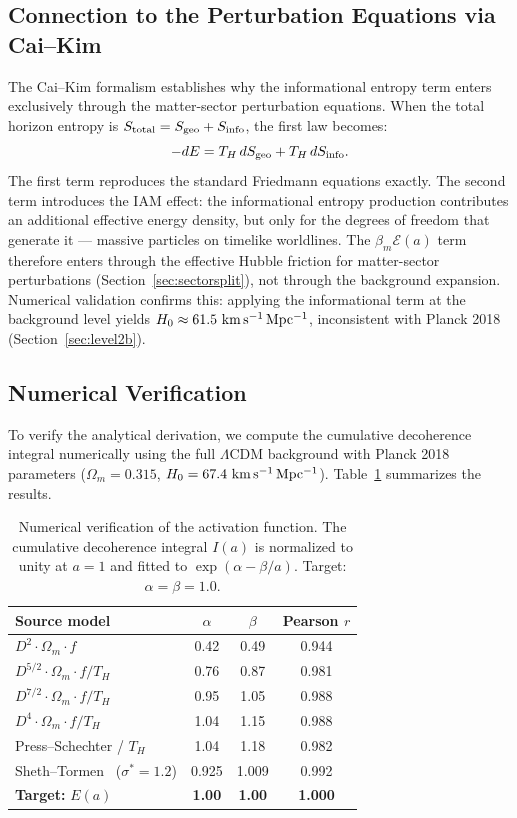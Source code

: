 \documentclass[twocolumn,a4paper,aps,prd,twocolumn,showpacs,notitlepage,superscriptaddress,nofootinbib]{article}
\newcommand{\LCDM}{$\Lambda$CDM}
\newcommand{\betam}{\beta_{m}}
\begin{document}
\subsection{Connection to the Perturbation Equations via Cai--Kim}

The Cai--Kim formalism establishes why the informational entropy term
enters exclusively through the matter-sector perturbation equations.  When
the total horizon entropy is $S_{\rm total} = S_{\rm geo} + S_{\rm info}$,
the first law becomes:
\begin{equation}
-dE = T_H\,dS_{\rm geo} + T_H\,dS_{\rm info}.
\end{equation}
The first term reproduces the standard Friedmann equations exactly.  The
second term introduces the IAM effect: the informational entropy production
contributes an additional effective energy density, but only for the
degrees of freedom that generate it --- massive particles on timelike
worldlines.  The $\betam\mathcal{E}(a)$ term therefore enters through the
effective Hubble friction for matter-sector perturbations
(Section~\ref{sec:sectorsplit}), not through the background expansion.
Numerical validation confirms this: applying the informational term at
the background level yields $H_0 \approx 61.5~\rm km\,s^{-1}\,Mpc^{-1}$,
inconsistent with Planck 2018 (Section~\ref{sec:level2b}).

\subsection{Numerical Verification}

To verify the analytical derivation, we compute the cumulative decoherence
integral numerically using the full \LCDM{} background with Planck 2018
parameters ($\Omega_m = 0.315$, $H_0 = 67.4~\rm km\,s^{-1}\,Mpc^{-1}$).
Table~\ref{tab:numerical} summarizes the results.

\begin{table}[t]
  \centering
  \caption{Numerical verification of the activation function.  The cumulative
    decoherence integral $I(a)$ is normalized to unity at $a=1$ and fitted to
    $\exp(\alpha - \beta/a)$.  Target: $\alpha = \beta = 1.0$.}
  \label{tab:numerical}
  \begin{tabular}{lccc}
    \toprule
    Source model & $\alpha$ & $\beta$ & Pearson $r$ \\
    \midrule
    $D^2 \cdot \Omega_m \cdot f$ & 0.42 & 0.49 & 0.944 \\
    $D^{5/2} \cdot \Omega_m \cdot f / T_H$ & 0.76 & 0.87 & 0.981 \\
    $D^{7/2} \cdot \Omega_m \cdot f / T_H$ & 0.95 & 1.05 & 0.988 \\
    $D^4 \cdot \Omega_m \cdot f / T_H$ & 1.04 & 1.15 & 0.988 \\
    Press--Schechter / $T_H$ & 1.04 & 1.18 & 0.982 \\
    Sheth--Tormen~\citep{ShethTormen1999} ($\sigma^* = 1.2$) & 0.925 & 1.009 & 0.992 \\
    \midrule
    \textbf{Target: }$E(a)$ & \textbf{1.00} & \textbf{1.00} & \textbf{1.000} \\
    \bottomrule
  \end{tabular}
\end{table}
\end{document}
